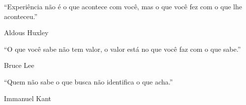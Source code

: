 \pagestyle{empty}
\newpage

$\phantom{0}$
\vspace{0.5\textheight}

\setlength{\epigraphrule}{0pt}
\epigraph{
``Experiência não é o que acontece com você, mas o que você fez com o que lhe 
aconteceu.''}{Aldous Huxley}

\setlength{\epigraphrule}{0pt}
\epigraph{
``O que você sabe não tem valor, o valor está no que você faz com o
que sabe.''}{Bruce Lee}
 
\setlength{\epigraphrule}{0pt}
\epigraph{
``Quem não sabe o que busca não identifica o que acha.''}{Immanuel Kant}

\mainmatter
